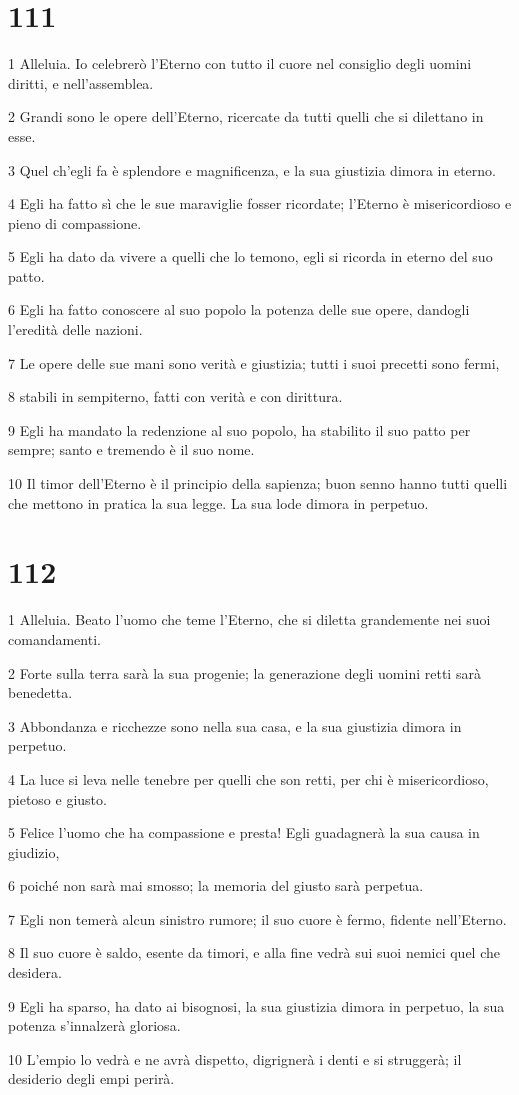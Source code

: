 \chapter{111}

\par 1 Alleluia. Io celebrerò l'Eterno con tutto il cuore nel consiglio degli uomini diritti, e nell'assemblea.
\par 2 Grandi sono le opere dell'Eterno, ricercate da tutti quelli che si dilettano in esse.
\par 3 Quel ch'egli fa è splendore e magnificenza, e la sua giustizia dimora in eterno.
\par 4 Egli ha fatto sì che le sue maraviglie fosser ricordate; l'Eterno è misericordioso e pieno di compassione.
\par 5 Egli ha dato da vivere a quelli che lo temono, egli si ricorda in eterno del suo patto.
\par 6 Egli ha fatto conoscere al suo popolo la potenza delle sue opere, dandogli l'eredità delle nazioni.
\par 7 Le opere delle sue mani sono verità e giustizia; tutti i suoi precetti sono fermi,
\par 8 stabili in sempiterno, fatti con verità e con dirittura.
\par 9 Egli ha mandato la redenzione al suo popolo, ha stabilito il suo patto per sempre; santo e tremendo è il suo nome.
\par 10 Il timor dell'Eterno è il principio della sapienza; buon senno hanno tutti quelli che mettono in pratica la sua legge. La sua lode dimora in perpetuo.

\chapter{112}

\par 1 Alleluia. Beato l'uomo che teme l'Eterno, che si diletta grandemente nei suoi comandamenti.
\par 2 Forte sulla terra sarà la sua progenie; la generazione degli uomini retti sarà benedetta.
\par 3 Abbondanza e ricchezze sono nella sua casa, e la sua giustizia dimora in perpetuo.
\par 4 La luce si leva nelle tenebre per quelli che son retti, per chi è misericordioso, pietoso e giusto.
\par 5 Felice l'uomo che ha compassione e presta! Egli guadagnerà la sua causa in giudizio,
\par 6 poiché non sarà mai smosso; la memoria del giusto sarà perpetua.
\par 7 Egli non temerà alcun sinistro rumore; il suo cuore è fermo, fidente nell'Eterno.
\par 8 Il suo cuore è saldo, esente da timori, e alla fine vedrà sui suoi nemici quel che desidera.
\par 9 Egli ha sparso, ha dato ai bisognosi, la sua giustizia dimora in perpetuo, la sua potenza s'innalzerà gloriosa.
\par 10 L'empio lo vedrà e ne avrà dispetto, digrignerà i denti e si struggerà; il desiderio degli empi perirà.


